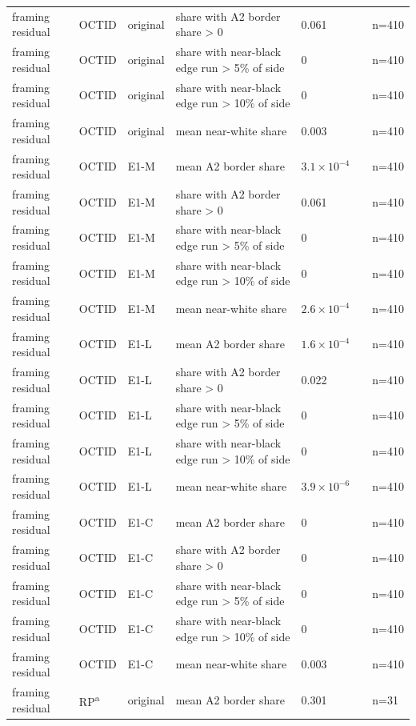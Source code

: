 \begin{longtable}{@{}p{3.3cm}lp{1.5cm}p{3.6cm}p{2.2cm}p{1.6cm}p{3.2cm}@{}}
framing residual & OCTID & original & share with A2 border share > 0 & 0.061 &  & n=410 \\
framing residual & OCTID & original & share with near-black edge run > 5\% of side & 0 &  & n=410 \\
framing residual & OCTID & original & share with near-black edge run > 10\% of side & 0 &  & n=410 \\
framing residual & OCTID & original & mean near-white share & 0.003 &  & n=410 \\
framing residual & OCTID & E1-M & mean A2 border share & $3.1\times10^{-4}$ &  & n=410 \\
framing residual & OCTID & E1-M & share with A2 border share > 0 & 0.061 &  & n=410 \\
framing residual & OCTID & E1-M & share with near-black edge run > 5\% of side & 0 &  & n=410 \\
framing residual & OCTID & E1-M & share with near-black edge run > 10\% of side & 0 &  & n=410 \\
framing residual & OCTID & E1-M & mean near-white share & $2.6\times10^{-4}$ &  & n=410 \\
framing residual & OCTID & E1-L & mean A2 border share & $1.6\times10^{-4}$ &  & n=410 \\
framing residual & OCTID & E1-L & share with A2 border share > 0 & 0.022 &  & n=410 \\
framing residual & OCTID & E1-L & share with near-black edge run > 5\% of side & 0 &  & n=410 \\
framing residual & OCTID & E1-L & share with near-black edge run > 10\% of side & 0 &  & n=410 \\
framing residual & OCTID & E1-L & mean near-white share & $3.9\times10^{-6}$ &  & n=410 \\
framing residual & OCTID & E1-C & mean A2 border share & 0 &  & n=410 \\
framing residual & OCTID & E1-C & share with A2 border share > 0 & 0 &  & n=410 \\
framing residual & OCTID & E1-C & share with near-black edge run > 5\% of side & 0 &  & n=410 \\
framing residual & OCTID & E1-C & share with near-black edge run > 10\% of side & 0 &  & n=410 \\
framing residual & OCTID & E1-C & mean near-white share & 0.003 &  & n=410 \\
framing residual & RP\textsuperscript{a} & original & mean A2 border share & 0.301 &  & n=31 \\

\end{longtable}
